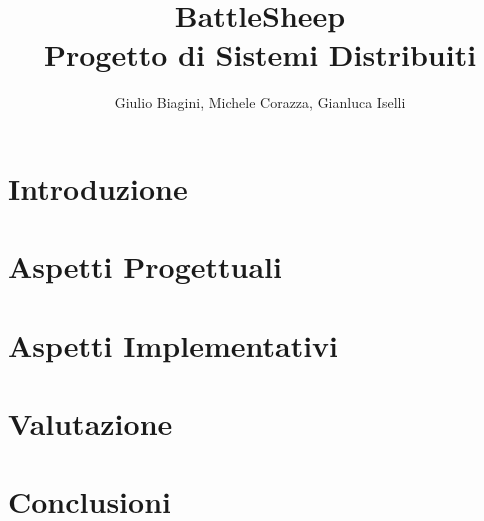 \documentclass[a4paper,10pt]{article}
\begin{document}
\title{BattleSheep \\ Progetto di Sistemi Distribuiti}
\author{Giulio Biagini, Michele Corazza, Gianluca Iselli}

\maketitle

\begin{abstract}

\end{abstract}

\section{Introduzione}


\section{Aspetti Progettuali}


\section{Aspetti Implementativi}


\section{Valutazione}


\section{Conclusioni}

\end{document}
